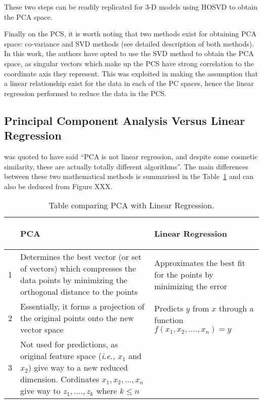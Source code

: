 \documentclass[preprint,12pt]{elsarticle}
\newcommand{\ie}{{\it i.e., }}
\begin{document}
These two steps can be readily replicated for 3-D models using HOSVD to obtain the PCA space.

Finally on the PCS, it is worth noting that two methods exist for obtaining PCA space: co-variance and SVD methods (see \cite{Tharwat_2016} detailed description of both methods). In this work, the authors have opted to use the SVD method to obtain the PCA space, as singular vectors which make up the PCS have strong correlation to the coordinate axis they represent. This was exploited in making the assumption that a linear relationship exist for the data in each of the PC spaces, hence the linear regression performed to reduce the data in the PCS. 

\subsection{Principal Component Analysis Versus Linear Regression}\label{subsection:pcs_vs_linreg}

\citet{AndrewNg_2018} was quoted to have said ``PCA is not linear regression, and despite some cosmetic similarity, these are actually totally different algorithms''. The main differences between these two mathematical methods is summarised in the Table~\ref{table:pca_vs_linreg} and can also be deduced from Figure XXX.

\begin{table}[h!]
\centering
\begin{tabular}{|m{1em} |m{14em} |m{14em}|} 
 \hline
  & \begin{center}{\bf PCA}\end{center} & \begin{center}{\bf Linear Regression}\end{center} \\ [0.5ex] 
 \hline
 1 & Determines the best vector (or set of vectors) which compresses the data points by minimizing the orthogonal distance to the points & Approximates the best fit for the points by minimizing the error \\
 \hline
 2 & Essentially, it forms a projection of the original points onto the new vector space & Predicts $y$ from $x$ through a function $f(x_1,x_2,....,x_n) = y$ \\
 \hline
 3 & Not used for predictions, as original feature space (\ie $x_1$ and $x_2$) give way to a new reduced dimension. Cordinates $x_1, x_2,...,x_n$ give way to $z_1,....,z_k$ where $k \leq n$ & \\[1ex]
 \hline
\end{tabular}
\caption{Table comparing PCA with Linear Regression.}
\label{table:pca_vs_linreg}
\end{table}
\end{document}
